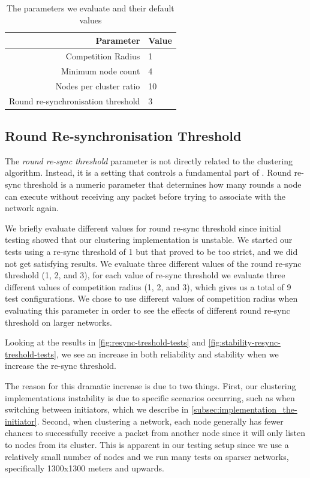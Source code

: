 \begin{table}[bt]
\centering
\caption{The parameters we evaluate and their default values}
\label{tab:parameter-default-values}
\begin{tabular}{r|l}
\textbf{Parameter}                 & \textbf{Value} \\ \hline
Competition Radius                 & 1              \\
Minimum node count                 & 4              \\
Nodes per cluster ratio            & 10             \\
Round re-synchronisation threshold & 3             
\end{tabular}
\end{table}

\subsection{Round Re-synchronisation Threshold}
The \emph{round re-sync threshold} parameter is not directly related to the clustering algorithm. Instead, it is a setting that controls a fundamental part of \atwo{}. Round re-sync threshold is a numeric parameter that determines how many rounds a node can execute without receiving any packet before trying to associate with the network again. 

We briefly evaluate different values for round re-sync threshold since initial testing showed that our clustering implementation is unstable. We started our tests using a re-sync threshold of 1 but that proved to be too strict, and we did not get satisfying results. We evaluate three different values of the round re-sync threshold (1, 2, and 3), for each value of re-sync threshold we evaluate three different values of competition radius (1, 2, and 3), which gives us a total of 9 test configurations. We chose to use different values of competition radius when evaluating this parameter in order to see the effects of different round re-sync threshold on larger networks.

Looking at the results in \cref{fig:resync-treshold-tests} and \cref{fig:stability-resync-treshold-tests}, we see an increase in both reliability and stability when we increase the re-sync threshold.


The reason for this dramatic increase is due to two things. First, our clustering implementations instability is due to specific scenarios occurring, such as when switching between initiators, which we describe in \cref{subsec:implementation_the-initiator}. Second, when clustering a network, each node generally has fewer chances to successfully receive a packet from another node since it will only listen to nodes from its cluster. This is apparent in our testing setup since we use a relatively small number of nodes and we run many tests on sparser networks, specifically 1300x1300 meters and upwards. 


